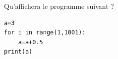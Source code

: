 \begin{exo}{}
	Qu'affichera le programme suivant ?

	\begin{lstlisting}
a=3
for i in range(1,1001):
    a=a+0.5
print(a)
\end{lstlisting}
\end{exo}
